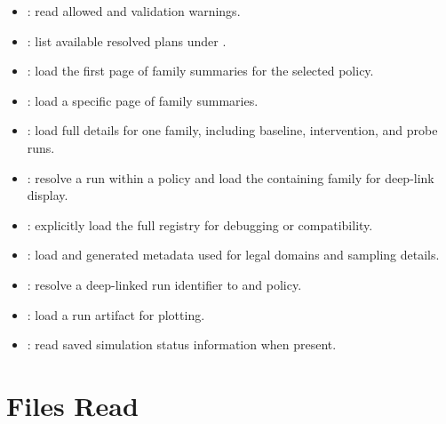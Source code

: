 \documentclass[11pt]{article}
\begin{document}
\begin{itemize}
\item {}: read allowed \termSimulators and validation warnings.
\item {}: list available resolved plans under .
\item {}: load the first page of family summaries for the selected policy.
\item {}: load a specific page of family summaries.
\item {}: load full details for one family, including baseline, intervention, and probe runs.
\item {}: resolve a run within a policy and load the containing family for deep-link display.
\item {}: explicitly load the full registry for debugging or compatibility.
\item {}: load  and generated metadata used for legal domains and sampling details.
\item {}: resolve a deep-linked run identifier to \termSimulator and policy.
\item {}: load a run artifact for plotting.
\item {}: read saved simulation status information when present.
\end{itemize}

\section*{Files Read}
\end{document}
